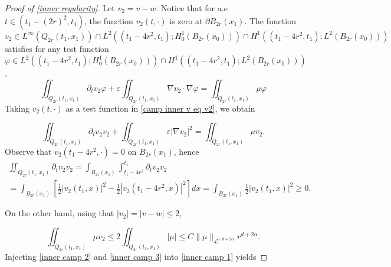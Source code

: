 \documentclass[reqno,12pt,twoside]{amsart}
\numberwithin{equation}{section} \numberwithin{theorem}{section}
\numberwithin{proposition}{section} \numberwithin{lemma}{section}
\numberwithin{corollary}{section}
\numberwithin{definition}{section} \numberwithin{remark}{section}
\begin{document}
\begin{proof}[Proof of \autoref{inner regularity}]
Let $v_2= v -w$. Notice that for a.e $t\in (t_1 - (2r)^2, t_1)$, the function $v_2(t,\cdot)$ is zero at $\partial B_{2r}(x_1)$. The function $v_2 \in L^\infty(Q_{2r}(t_1,x_1))\cap L^2((t_1-4r^2,t_1);H_0^1(B_{2r}(x_0))) \cap H^1((t_1-4r^2,t_1);L^2(B_{2r}(x_0)))$ satisfies for any test function $\varphi\in L^2((t_1-4r^2,t_1);H_0^1(B_{2r}(x_0))) \cap H^1((t_1-4r^2,t_1);L^2(B_{2r}(x_0)))$, 
\begin{equation}\label{camp inner v eq v2}
\iint_{Q_{2r}(t_1,x_1)}\partial_t v_2 \varphi + \varepsilon \iint_{Q_{2r}(t_1,x_1)} \nabla v_2\cdot \nabla \varphi =\iint_{Q_{2r}(t_1,x_1)}\mu \varphi
\end{equation}
Taking $v_2(t,\cdot)$ as a test function in \eqref{camp inner v eq v2}, we obtain 

\begin{equation}\label{inner camp 1}
\iint_{Q_{2r}(t_1, x_1)} \partial_t v_2 v_2 + \iint_{Q_{2r}(t_1,x_1)} \varepsilon |\nabla v_2|^2 = \iint_{Q_{2r}(t_1,x_1)} \mu v_2.
\end{equation}
Observe that $v_2 (t_1 -4r^2, \cdot) = 0$ on $B_{2r}(x_1)$, hence 
\begin{multline}\label{inner camp 2}
\iint_{Q_{2r}(t_1, x_1)} \partial_t v_2 v_2 = \int_{B_{2r}(x_1)} \int_{t_1 -4r^2}^{t_1} \partial_t v_2 v_2 \\
= \int_{B_{2r}(x_1)} \left[\frac{1}{2} |v_2 (t_1, x)|^2 -\frac{1}{2}|v_2 (t_1 -4r^2, x)|^2\right]dx = \int_{B_{2r}(x_1)} \frac{1}{2} |v_2 (t_1, x)|^2  \geqslant 0.
\end{multline}

On the other hand, using that $|v_2| = |v -w|\leqslant 2$,

\begin{equation}\label{inner camp 3}
\iint_{Q_{2r}(t_1,x_1)} \mu v_2 \leqslant 2\iint_{Q_{2r}(t_1,x_1)} |\mu| \leqslant C\|\mu\|_{\mathcal{L}^{1, d+2\alpha}} r^{d+2\alpha}.
\end{equation}  
Injecting \eqref{inner camp 2} and \eqref{inner camp 3} into \eqref{inner camp 1} yields


\end{proof}
\end{document}
